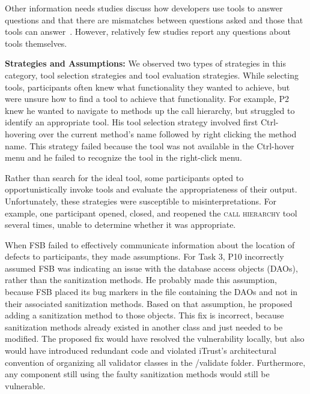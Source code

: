 \documentclass[10pt,journal,compsoc]{IEEEtran}
\begin{document}
Other information needs studies discuss how developers use tools to answer questions and that there are mismatches between questions asked and those that tools can answer~\cite{Ko:2007:information, sillito2008asking}.
However, relatively few studies report any questions about tools themselves.


\textbf{Strategies and Assumptions:}
We observed two types of strategies in this category, tool selection strategies and tool evaluation strategies. 
While selecting tools, participants often knew what functionality they wanted to achieve, but were unsure how to find a tool to achieve that functionality. For example, P2 knew he wanted to navigate to methods up the call hierarchy, but struggled to identify an appropriate tool. 
His tool selection strategy involved first Ctrl-hovering over the current method's name followed by right clicking the method name.
This strategy failed because the tool was not available in the Ctrl-hover menu and he failed to recognize the tool in the right-click menu.

Rather than search for the ideal tool, some participants opted to opportunistically invoke tools and evaluate the appropriateness of their output. Unfortunately, these strategies were susceptible to misinterpretations. For example, one participant opened, closed, and reopened the \textsc{call hierarchy} tool several times, unable to determine whether it was appropriate. 

When FSB failed to effectively communicate information about the location of defects to participants, they made assumptions.
For Task 3, P10 incorrectly assumed FSB was indicating an issue with the database access objects (DAOs), rather than the sanitization methods.
He probably made this assumption, because FSB placed its bug markers in the file containing the DAOs and not in their associated sanitization methods. 
Based on that assumption, he proposed adding a sanitization method to those objects.
This fix is incorrect, because sanitization methods already existed in another class and just needed to be modified.
The proposed fix would have resolved the vulnerability locally, but also would have introduced redundant code and violated iTrust's architectural convention of organizing all validator classes in the /validate folder.
Furthermore, any component still using the faulty sanitization methods would still be vulnerable.

\end{document}
